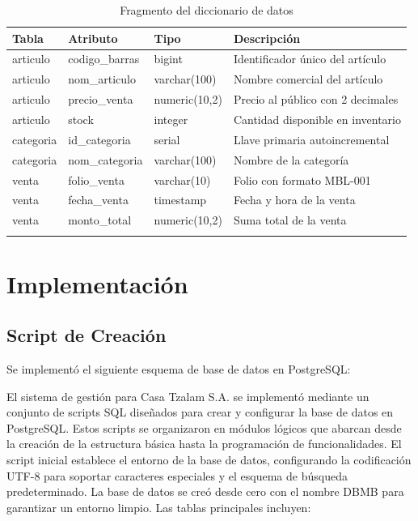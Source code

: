 \documentclass[a4paper, 12pt]{article}
\begin{document}
\begin{longtable}{|p{2.5cm}|p{2.5cm}|p{2.5cm}|p{6cm}|}
\hline
\textbf{Tabla} & \textbf{Atributo} & \textbf{Tipo} & \textbf{Descripción} \\ \hline
\endhead

articulo & codigo\_barras & bigint & Identificador único del artículo\\ \hline
articulo & nom\_articulo & varchar(100) & Nombre comercial del artículo \\ \hline
articulo & precio\_venta & numeric(10,2) & Precio al público con 2 decimales \\ \hline
articulo & stock & integer & Cantidad disponible en inventario \\ \hline

categoria & id\_categoria & serial & Llave primaria autoincremental \\ \hline
categoria & nom\_categoria & varchar(100) & Nombre de la categoría \\ \hline

venta & folio\_venta & varchar(10) & Folio con formato MBL-001 \\ \hline
venta & fecha\_venta & timestamp & Fecha y hora de la venta \\ \hline
venta & monto\_total & numeric(10,2) & Suma total de la venta \\ \hline

\caption{Fragmento del diccionario de datos}
\end{longtable}

\section{Implementación}
\subsection{Script de Creación}

Se implementó el siguiente esquema de base de datos en PostgreSQL:

El sistema de gestión para Casa Tzalam S.A. se implementó mediante un conjunto de scripts SQL diseñados para crear y configurar la base de datos en PostgreSQL. 
Estos scripts se organizaron en módulos lógicos que abarcan desde la creación de la estructura básica hasta la programación de funcionalidades.
\vspace{5mm}
El script inicial establece el entorno de la base de datos, configurando la codificación UTF-8 para soportar caracteres especiales y el esquema de búsqueda predeterminado. 
La base de datos se creó desde cero con el nombre DBMB para garantizar un entorno limpio. Las tablas principales incluyen:
\end{document}
